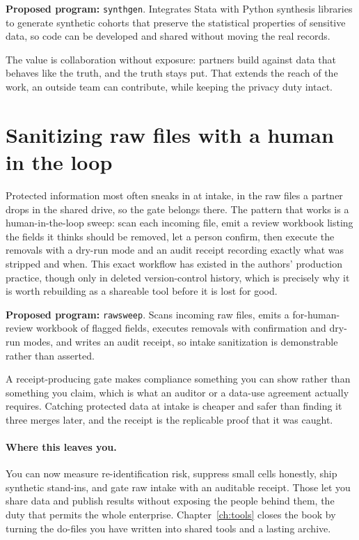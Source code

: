 \documentclass[
    a4paper,
    fontsize=10pt,
    twoside=true,
    numbers=noenddot,
]{kaobook}
\begin{document}
\begin{kaobox}[frametitle=Ado-file Idea: \texttt{synthgen}]
\textbf{Proposed program:} \texttt{synthgen}. Integrates Stata with Python synthesis libraries to generate synthetic cohorts that preserve the statistical properties of sensitive data, so code can be developed and shared without moving the real records.
\end{kaobox}

The value is collaboration without exposure: partners build against data that behaves like the truth, and the truth stays put. That extends the reach of the work, an outside team can contribute, while keeping the privacy duty intact.

\section{Sanitizing raw files with a human in the loop}
Protected information most often sneaks in at intake, in the raw files a partner drops in the shared drive, so the gate belongs there. The pattern that works is a human-in-the-loop sweep: scan each incoming file, emit a review workbook listing the fields it thinks should be removed, let a person confirm, then execute the removals with a dry-run mode and an audit receipt recording exactly what was stripped and when. This exact workflow has existed in the authors' production practice, though only in deleted version-control history, which is precisely why it is worth rebuilding as a shareable tool before it is lost for good.

\begin{kaobox}[frametitle=Ado-file Idea: \texttt{rawsweep}]
\textbf{Proposed program:} \texttt{rawsweep}. Scans incoming raw files, emits a for-human-review workbook of flagged fields, executes removals with confirmation and dry-run modes, and writes an audit receipt, so intake sanitization is demonstrable rather than asserted.
\end{kaobox}

A receipt-producing gate makes compliance something you can show rather than something you claim, which is what an auditor or a data-use agreement actually requires. Catching protected data at intake is cheaper and safer than finding it three merges later, and the receipt is the replicable proof that it was caught.

\paragraph{Where this leaves you.} You can now measure re-identification risk, suppress small cells honestly, ship synthetic stand-ins, and gate raw intake with an auditable receipt. Those let you share data and publish results without exposing the people behind them, the duty that permits the whole enterprise. Chapter~\ref{ch:tools} closes the book by turning the do-files you have written into shared tools and a lasting archive.
\end{document}
